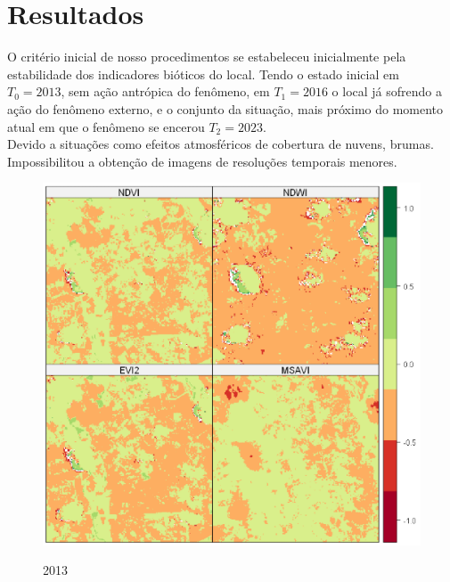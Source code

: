 
\section{ Resultados }
 
\hspace*{1.25 cm} O critério inicial de nosso procedimentos se estabeleceu inicialmente pela estabilidade dos indicadores bióticos do local. Tendo o  estado inicial em $ T_{0} =  2013$, sem ação antrópica do fenômeno, em $T _{1} =  2016$ o local já sofrendo a ação do fenômeno externo, e o conjunto da situação, mais próximo do momento atual em que o fenômeno se encerou $T _{2} =  2023$. \\
\hspace*{1.25 cm} Devido a situações como efeitos atmosféricos de  cobertura de nuvens, brumas. Impossibilitou a obtenção de imagens de resoluções temporais menores.\\ 
 			\begin{minipage}[t!]{0.31\textwidth}
 				\begin{figure}[H]
 					\centering \small \caption{2013}
 					\includegraphics[width=0.97\linewidth]{FIGURAS/indices20131023}
 					\label{fig:ima2013} 
 				\end{figure}			
 				
 			\end{minipage}\hfill
